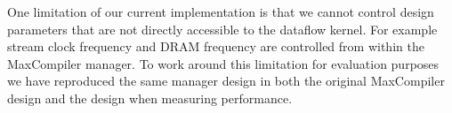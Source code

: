 One limitation of our current implementation is that we cannot control
design parameters that are not directly accessible to the dataflow
kernel. For example stream clock frequency and DRAM frequency are
controlled from within the MaxCompiler manager. To work around this
limitation for evaluation purposes we have reproduced the same manager
design in both the original MaxCompiler design and the \FAST{} design
when measuring performance.
